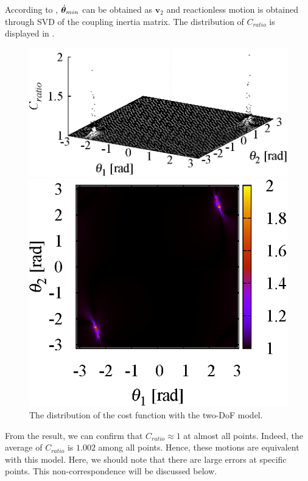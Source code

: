 According to , ${\dot{\bm{\theta}}}_{min}$ can be obtained as $\bm{v}_{2}$ and reactionless motion
is obtained through SVD of the coupling inertia matrix.
The distribution of $C_{ratio}$ is displayed in .
%
\begin{figure}[t]
  \centering
  \begin{minipage}{0.49\linewidth}
    \centering
    \includegraphics[width=1.0\linewidth]{fig/chapter5/analysis/err.eps}
  \end{minipage}
  \begin{minipage}{0.37\linewidth}
    \centering
    \includegraphics[width=1.0\linewidth]{fig/chapter5/analysis/err_2d.eps}
  \end{minipage}
  \caption{The distribution of the cost function with the two-DoF model.}
  \label{fig:dist_2D}
\end{figure}
%
From the result,
we can confirm that $C_{ratio} \approx 1$ at almost all points.
Indeed, the average of $C_{ratio}$ is $1.002$  among all points.
Hence, these motions are equivalent with this model.
Here, we should note that there are large errors at specific points.
This non-correspondence will be discussed below.


